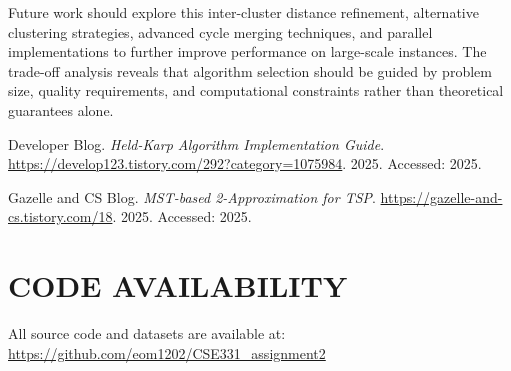 \documentclass[sigconf]{acmart}
\begin{document}
Future work should explore this inter-cluster distance refinement, alternative clustering strategies, advanced cycle merging techniques, and parallel implementations to further improve performance on large-scale instances. The trade-off analysis reveals that algorithm selection should be guided by problem size, quality requirements, and computational constraints rather than theoretical guarantees alone.

\begin{thebibliography}{2}

Developer Blog.
\textit{Held-Karp Algorithm Implementation Guide}.
\url{https://develop123.tistory.com/292?category=1075984}.
2025. Accessed: 2025.

Gazelle and CS Blog.
\textit{MST-based 2-Approximation for TSP}.
\url{https://gazelle-and-cs.tistory.com/18}.
2025. Accessed: 2025.

\end{thebibliography}

\section*{CODE AVAILABILITY}
All source code and datasets are available at: \url{https://github.com/eom1202/CSE331_assignment2}
\end{document}
